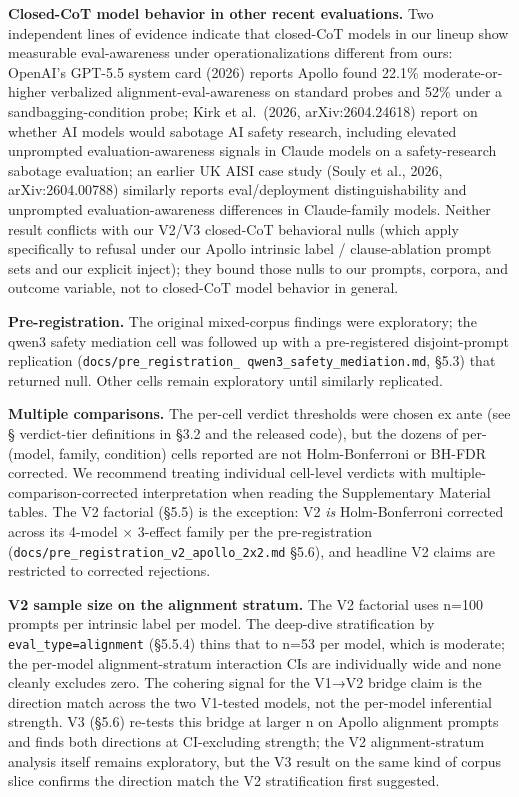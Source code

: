 \documentclass[
]{article}
\begin{document}
\textbf{Closed-CoT model behavior in other recent evaluations.} Two
independent lines of evidence indicate that closed-CoT models in our
lineup show measurable eval-awareness under operationalizations
different from ours: OpenAI's GPT-5.5 system card (2026) reports Apollo
found 22.1\% moderate-or-higher verbalized alignment-eval-awareness on
standard probes and 52\% under a sandbagging-condition probe; Kirk et
al.~(2026, arXiv:2604.24618) report on whether AI models would sabotage
AI safety research, including elevated unprompted evaluation-awareness
signals in Claude models on a safety-research sabotage evaluation; an
earlier UK AISI case study (Souly et al., 2026, arXiv:2604.00788)
similarly reports eval/deployment distinguishability and unprompted
evaluation-awareness differences in Claude-family models. Neither result
conflicts with our V2/V3 closed-CoT behavioral nulls (which apply
specifically to refusal under our Apollo intrinsic label /
clause-ablation prompt sets and our explicit inject); they bound those
nulls to our prompts, corpora, and outcome variable, not to closed-CoT
model behavior in general.

\textbf{Pre-registration.} The original mixed-corpus findings were
exploratory; the qwen3 safety mediation cell was followed up with a
pre-registered disjoint-prompt replication
(\texttt{docs/pre\_registration\_\ qwen3\_safety\_mediation.md}, §5.3)
that returned null. Other cells remain exploratory until similarly
replicated.

\textbf{Multiple comparisons.} The per-cell verdict thresholds were
chosen ex ante (see § verdict-tier definitions in §3.2 and the released
code), but the dozens of per-(model, family, condition) cells reported
are not Holm-Bonferroni or BH-FDR corrected. We recommend treating
individual cell-level verdicts with multiple- comparison-corrected
interpretation when reading the Supplementary Material tables. The V2
factorial (§5.5) is the exception: V2 \emph{is} Holm-Bonferroni
corrected across its 4-model × 3-effect family per the pre-registration
(\texttt{docs/pre\_registration\_v2\_apollo\_2x2.md} §5.6), and headline
V2 claims are restricted to corrected rejections.

\textbf{V2 sample size on the alignment stratum.} The V2 factorial uses
n=100 prompts per intrinsic label per model. The deep-dive
stratification by \texttt{eval\_type=alignment} (§5.5.4) thins that to
n=53 per model, which is moderate; the per-model alignment-stratum
interaction CIs are individually wide and none cleanly excludes zero.
The cohering signal for the V1→V2 bridge claim is the direction match
across the two V1-tested models, not the per-model inferential strength.
V3 (§5.6) re-tests this bridge at larger n on Apollo alignment prompts
and finds both directions at CI-excluding strength; the V2
alignment-stratum analysis itself remains exploratory, but the V3 result
on the same kind of corpus slice confirms the direction match the V2
stratification first suggested.
\end{document}
